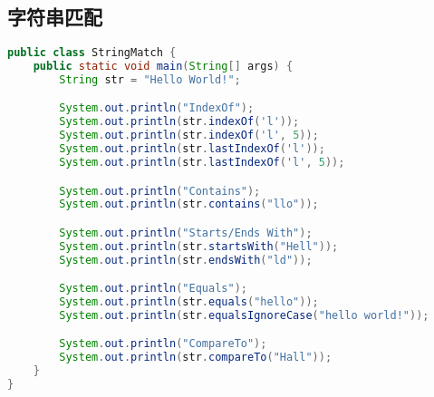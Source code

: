 \subsection{字符串匹配}

\begin{table}[H]
	\centering
\end{table}

\vspace{0.5cm}


\begin{lstlisting}[language=Java]
public class StringMatch {
	public static void main(String[] args) {
		String str = "Hello World!";

		System.out.println("IndexOf");
		System.out.println(str.indexOf('l'));
		System.out.println(str.indexOf('l', 5));
		System.out.println(str.lastIndexOf('l'));
		System.out.println(str.lastIndexOf('l', 5));

		System.out.println("Contains");
		System.out.println(str.contains("llo"));

		System.out.println("Starts/Ends With");
		System.out.println(str.startsWith("Hell"));
		System.out.println(str.endsWith("ld"));

		System.out.println("Equals");
		System.out.println(str.equals("hello"));
		System.out.println(str.equalsIgnoreCase("hello world!"));

		System.out.println("CompareTo");
		System.out.println(str.compareTo("Hall"));
	}
}
\end{lstlisting}


